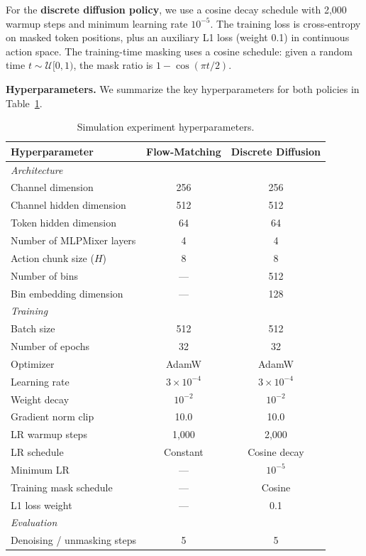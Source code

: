 \documentclass{article}
\begin{document}
For the \textbf{discrete diffusion policy}, we use a cosine decay schedule with 2{,}000 warmup steps and minimum learning rate $10^{-5}$.
The training loss is cross-entropy on masked token positions, plus an auxiliary L1 loss (weight 0.1) in continuous action space.
The training-time masking uses a cosine schedule: given a random time $t \sim \mathcal{U}[0, 1)$, the mask ratio is $1 - \cos(\pi t / 2)$.

\textbf{Hyperparameters.}
We summarize the key hyperparameters for both policies in Table~\ref{tab:hyperparams_sim}.

\begin{table}[h]
\centering
\caption{Simulation experiment hyperparameters.}
\label{tab:hyperparams_sim}
\begin{tabular}{lcc}
\toprule
\textbf{Hyperparameter} & \textbf{Flow-Matching} & \textbf{Discrete Diffusion} \\
\midrule
\multicolumn{3}{l}{\textit{Architecture}} \\
Channel dimension & 256 & 256 \\
Channel hidden dimension & 512 & 512 \\
Token hidden dimension & 64 & 64 \\
Number of MLPMixer layers & 4 & 4 \\
Action chunk size ($H$) & 8 & 8 \\
Number of bins & --- & 512 \\
Bin embedding dimension & --- & 128 \\
\midrule
\multicolumn{3}{l}{\textit{Training}} \\
Batch size & 512 & 512 \\
Number of epochs & 32 & 32 \\
Optimizer & AdamW & AdamW \\
Learning rate & $3 \times 10^{-4}$ & $3 \times 10^{-4}$ \\
Weight decay & $10^{-2}$ & $10^{-2}$ \\
Gradient norm clip & 10.0 & 10.0 \\
LR warmup steps & 1{,}000 & 2{,}000 \\
LR schedule & Constant & Cosine decay \\
Minimum LR & --- & $10^{-5}$ \\
Training mask schedule & --- & Cosine \\
L1 loss weight & --- & 0.1 \\
\midrule
\multicolumn{3}{l}{\textit{Evaluation}} \\
Denoising / unmasking steps & 5 & 5 \\

\end{tabular}
\end{table}
\end{document}
